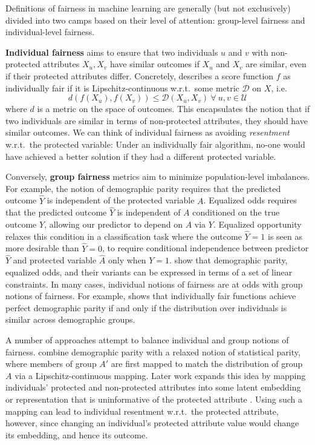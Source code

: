     Definitions of fairness in machine learning are generally (but not exclusively) divided into two camps based on their level of attention: group-level fairness and individual-level fairness.
    
    \textbf{Individual fairness} aims to ensure that two individuals $u$ and $v$ with non-protected attributes $X_u, X_v$ have similar outcomes if $X_u$ and $X_v$ are similar, even if their protected attributes differ. Concretely, \citep{dwork2012fairness} describes a score function $f$ as individually fair if it is Lipschitz-continuous w.r.t.\ some metric $\mathcal{D}$ on $X$, i.e.\
    \begin{equation}d(f(X_u), f(X_v)) \le \mathcal{D}(X_u, X_v) ~\forall~ u, v \in \mathcal{U}\label{eqn:IndFair}\end{equation}
    where $d$ is a metric on the space of outcomes. This encapsulates the notion that if two individuals are similar in terms of non-protected attributes, they should have similar outcomes. We can think of individual fairness as avoiding \textit{resentment} w.r.t.\ the protected variable: Under an individually fair algorithm, no-one would have achieved a better solution if they had a different protected variable. 
    
    
    Conversely, \textbf{group fairness} metrics aim to minimize population-level imbalances. For example, the notion of demographic parity \citep{dwork2012fairness} requires that the predicted outcome $\hat{Y}$ is independent of the protected variable $A$. Equalized odds \citep{HarPriSre2016} requires that the predicted outcome $\hat{Y}$ is independent of $A$ conditioned on the true outcome $Y$, allowing our predictor to depend on $A$ via $Y$. Equalized opportunity \citep{HarPriSre2016} relaxes this condition in a classification task where the outcome $\hat{Y}=1$ is seen as more desirable than $\hat{Y}=0$, to require conditional independence between predictor $\hat{Y}$ and protected variable $\hat{A}$ only when $Y=1$. \cite{AgaBeyDudLanWal2018} show that demographic parity, equalized odds, and their variants can be expressed in terms of a set of linear constraints.  In many cases, individual notions of fairness are at odds with group notions of fairness. For example, \cite{dwork2012fairness} shows that individually fair functions achieve perfect demographic parity if and only if the distribution over individuals is similar across demographic groups.
    
    A number of approaches attempt to balance individual and group notions of fairness. \cite{dwork2012fairness} combine demographic parity with a relaxed notion of statistical parity, where members of group $A'$ are first mapped to match the distribution of group $A$ via a Lipschitz-continuous mapping. Later work expands this idea by mapping individuals' protected and non-protected attributes into some latent embedding or representation that is uninformative of the protected attribute \citep{ZemQiSwePitDwo2013,MadCrePitZem2018}. Using such a mapping can lead to individual resentment w.r.t.\ the protected attribute, however,  since changing an individual's protected attribute value would change its embedding, and hence its outcome.
    
